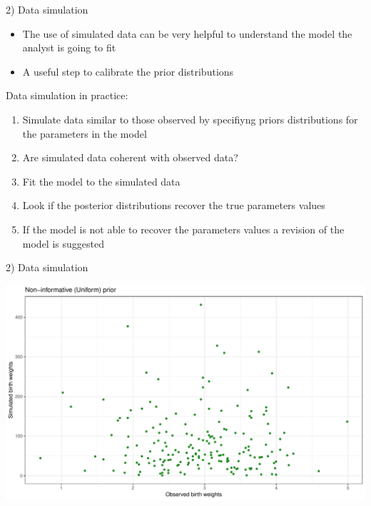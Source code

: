 \documentclass[ignorenonframetext,a4paper]{beamer}
\begin{document}
\begin{frame}{2) Data simulation}

\begin{itemize}
\setlength\itemsep{1em}
  \item{The use of simulated data can be very helpful to understand
        the model the analyst is going to fit}
  \item{A useful step to calibrate the prior distributions}
\end{itemize}

Data simulation in practice: \footnotesize

\begin{enumerate}
  \item{Simulate data similar to those observed by specifiyng priors
        distributions for the parameters in the model}
  \item{Are simulated data coherent with observed data?}
  \item{Fit the model to the simulated data}
  \item{Look if the posterior distributions recover the true parameters
        values}
  \item{If the model is not able to recover the parameters values a
        revision of the model is suggested}
\end{enumerate}

\end{frame}

\begin{frame}{2) Data simulation}

\includegraphics{DB_presentation_slides_files/figure-beamer/unnamed-chunk-5-1.pdf}

\end{frame}
\end{document}
